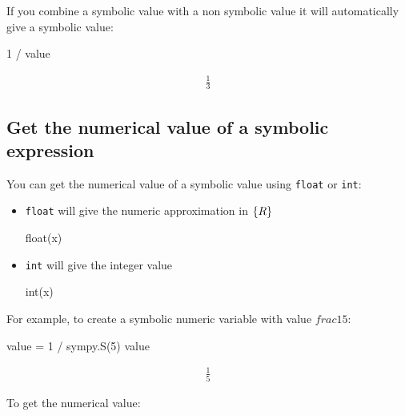 If you combine a symbolic value with a non symbolic value it will automatically
give a symbolic value:

\begin{pyin}
1 / value
\end{pyin}

\begin{equation*}
\begin{split}\displaystyle \frac{1}{3}\end{split}
\end{equation*}

\subsection{Get the numerical value of a symbolic expression}
\label{\detokenize{tools-for-mathematics/02-algebra/how/main:how-to-get-the-numerical-value-of-a-symbolic-expression}}

You can get the numerical value of a symbolic value using \texttt{float} or
\texttt{int}:
\begin{itemize}
\item 

\texttt{float} will give the numeric approximation in \(\mathbb\{R\}\)

\begin{api}
float(x)
\end{api}

\item 

\texttt{int} will give the integer value

\begin{api}
int(x)
\end{api}

\end{itemize}


For example, to create a symbolic numeric variable with value
\(frac{1}{5}\):

\begin{pyin}
value = 1 / sympy.S(5)
value
\end{pyin}




\begin{equation*}
\begin{split}\displaystyle \frac{1}{5}\end{split}
\end{equation*}




To get the numerical value:




